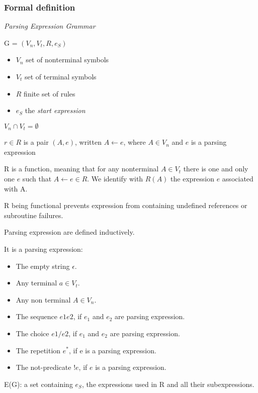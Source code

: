 \begin{frame}
	\frametitle{Formal definition}
	\emph{Parsing Expression Grammar}
	
	\begin{center}
		G = $(V_n,V_t,R, e_S)$
	\end{center}

\begin{itemize}
	\item $V_n$ set of nonterminal symbols
	\item $V_t$ set of terminal symbols
	\item $R$ finite set of rules 
	\item $e_S$ the \emph{start expression}
\end{itemize}

$V_n \cap V_t = \emptyset$


\end{frame}
\begin{frame}
	$r \in R$ is a pair $(A,e)$, written $A \leftarrow e$, where $A \in V_n$ and $e$ is a parsing expression
	
	R is a function, meaning that for any nonterminal $A \in V_t$ there is one and only one $e$ such that $A \leftarrow e \in R$. We identify with $R(A)$ the  expression $e$ associated with A.
	
	R being functional prevents expression from containing undefined references or subroutine failures.
\end{frame}
\begin{frame}
	Parsing expression are defined inductively. 
	
	It is a parsing expression:
	\begin{itemize}
		\item The empty string $\epsilon$. 
		\item Any terminal $a \in V_t$.
		\item Any non terminal $A \in V_n$.
		\item The sequence $e1e2$, if $e_1$ and $e_2$ are parsing expression.
		\item The choice $e1/e2$, if $e_1$ and $e_2$ are parsing expression.
		\item The repetition $e^*$, if  e is a parsing expression.
		\item The not-predicate $!e$, if $e$ is a parsing expression.
	\end{itemize}
\begin{block}{}
	E(G):  a set  containing $e_S$, the expressions used in R and all their subexpressions.
\end{block}
\end{frame}

